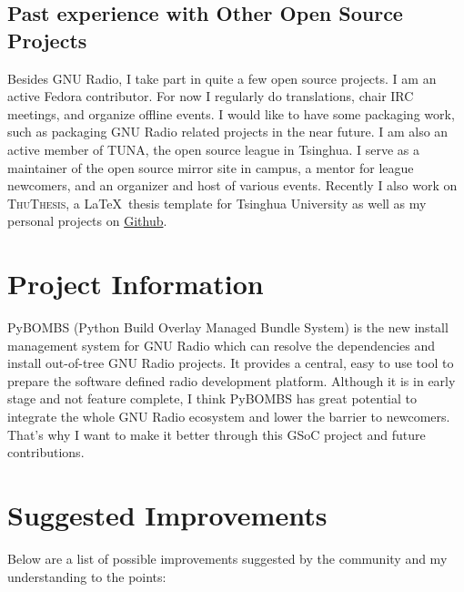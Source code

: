 \documentclass[a4paper]{article}
\begin{document}
\subsection{Past experience with Other Open Source Projects}

Besides GNU Radio, I take part in quite a few open source projects.  I
am an active Fedora contributor. For now I regularly do translations,
chair IRC meetings, and organize offline events.  I would like to have
some packaging work, such as packaging GNU Radio related projects in the
near future. I am also an active member of TUNA, the open source league
in Tsinghua. I serve as a maintainer of the open source mirror site in
campus, a mentor for league newcomers, and an organizer and host of various
events. Recently I also work on \textsc{ThuThesis}, a \LaTeX\ thesis template
for Tsinghua University as well as my personal projects on
\href{https://github.com/alick9188}{Github}.

\section{Project Information}

PyBOMBS (Python Build Overlay Managed Bundle System) is the new install
management system for GNU Radio which can resolve the dependencies and
install out-of-tree GNU Radio projects. It provides a central, easy to
use tool to prepare the software defined radio development platform.
Although it is in early stage and not feature
complete, I think PyBOMBS has great potential to integrate the whole GNU
Radio ecosystem and lower the barrier to newcomers. That's why I want to
make it better through this GSoC project and future contributions.

\section{Suggested Improvements}

Below are a list of possible improvements suggested by the community
and my understanding to the points:
\end{document}
